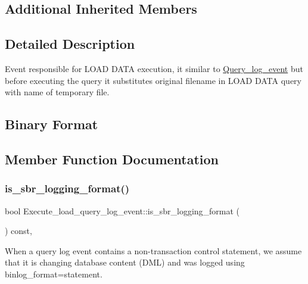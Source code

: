 \subsection*{Additional Inherited Members}


\subsection{Detailed Description}
Event responsible for L\+O\+AD D\+A\+TA execution, it similar to \mbox{\hyperlink{classQuery__log__event}{Query\+\_\+log\+\_\+event}} but before executing the query it substitutes original filename in L\+O\+AD D\+A\+TA query with name of temporary file.\hypertarget{classExecute__load__query__log__event_Execute_load_query_log_event_binary_format}{}\subsection{Binary Format}\label{classExecute__load__query__log__event_Execute_load_query_log_event_binary_format}


\subsection{Member Function Documentation}
\mbox{\label{classExecute__load__query__log__event_a8980ecbe8b7f0431a201498aa245c88d}} 
\subsubsection{\texorpdfstring{is\+\_\+sbr\+\_\+logging\+\_\+format()}{is\_sbr\_logging\_format()}}
{\footnotesize\ttfamily bool Execute\+\_\+load\+\_\+query\+\_\+log\+\_\+event\+::is\+\_\+sbr\+\_\+logging\+\_\+format (\begin{DoxyParamCaption}{ }\end{DoxyParamCaption}) const\hspace{0.3cm}{\ttfamily [inline]}, {\ttfamily [virtual]}}

When a query log event contains a non-\/transaction control statement, we assume that it is changing database content (D\+ML) and was logged using binlog\+\_\+format=statement.

